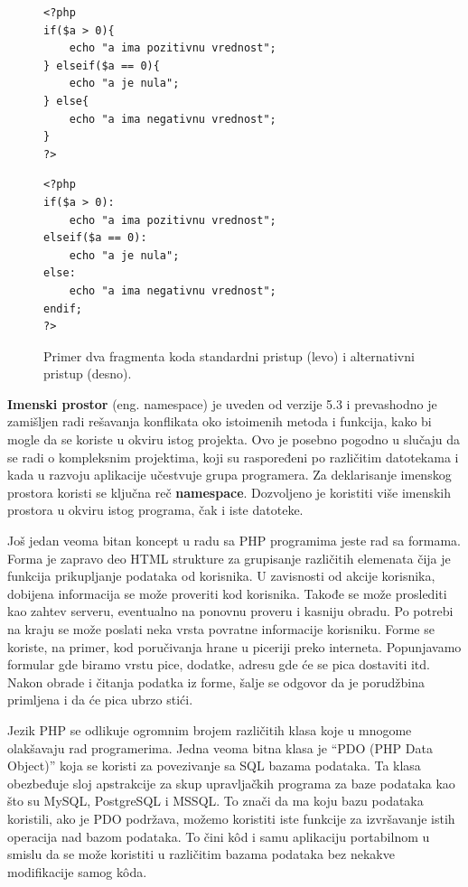 \documentclass[a4paper]{article}
\begin{document}
{\begin{figure}[h]
		\centering
		\begin{minipage}{0.35\textwidth}
\begin{lstlisting}
<?php
if($a > 0){
	echo "a ima pozitivnu vrednost";
} elseif($a == 0){
	echo "a je nula";	
} else{
	echo "a ima negativnu vrednost";	
}
?>	
\end{lstlisting}
		\end{minipage}
		\hfill
		\begin{minipage}{0.35\textwidth}
\begin{lstlisting}
<?php
if($a > 0):
	echo "a ima pozitivnu vrednost";
elseif($a == 0):
	echo "a je nula";	
else:
	echo "a ima negativnu vrednost";	
endif;
?>	
\end{lstlisting}
		\end{minipage}
		\caption{Primer dva fragmenta koda standardni pristup (levo) i alternativni pristup (desno).}
		\label{fig:stand_alt}
\end{figure}



\textbf{Imenski prostor} (eng. namespace) \cite{phpSrbija} je uveden od verzije 5.3 i prevashodno je zamišljen radi rešavanja konflikata oko istoimenih metoda i funkcija, kako bi mogle da se koriste u okviru istog projekta. Ovo je posebno pogodno u slučaju da se radi o kompleksnim projektima, koji su raspoređeni po različitim datotekama i kada u razvoju aplikacije učestvuje grupa programera. Za deklarisanje imenskog prostora koristi se ključna reč \textbf{namespace}. Dozvoljeno je koristiti više imenskih prostora u okviru istog programa, čak i iste datoteke.

Još jedan veoma bitan koncept u radu sa PHP programima jeste rad sa formama. Forma je zapravo deo HTML strukture za grupisanje različitih elemenata čija je funkcija prikupljanje podataka od korisnika. U zavisnosti od akcije korisnika, dobijena informacija se može proveriti kod korisnika. Takođe se može proslediti kao zahtev serveru, eventualno na ponovnu proveru i kasniju obradu. Po potrebi na kraju se može poslati neka vrsta povratne informacije korisniku. Forme se koriste, na primer, kod poručivanja hrane u piceriji preko interneta. Popunjavamo formular gde biramo vrstu pice, dodatke, adresu gde će se pica dostaviti itd. Nakon obrade i čitanja podatka iz forme, šalje se odgovor da je porudžbina primljena i da će pica ubrzo stići.

Jezik PHP se odlikuje ogromnim brojem različitih klasa koje u mnogome olakšavaju rad programerima. Jedna veoma bitna klasa je “PDO (PHP Data Object)”\cite{PHPtheGoodParts, phpSrbija} koja se koristi za povezivanje sa SQL bazama podataka. Ta klasa obezbeđuje sloj apstrakcije za skup upravljačkih programa za baze podataka kao što su MySQL, PostgreSQL i MSSQL. To znači da ma koju bazu podataka koristili, ako je PDO podržava, možemo koristiti iste funkcije za izvršavanje istih operacija nad bazom podataka. To čini k\^{o}d i samu aplikaciju portabilnom u smislu da se može koristiti u različitim bazama podataka bez nekakve modifikacije samog k\^{o}da.

}
\end{document}

